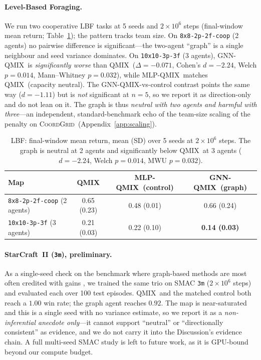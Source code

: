 \documentclass[manuscript, screen, review]{jair}
\providecommand{\citep}{\parencite}
\newcommand{\algoname}[1]{\textsc{#1}}
\newcommand{\qmix}{\algoname{QMIX}}
\newcommand{\gnnqmix}{\algoname{GNN-QMIX}}
\newcommand{\coordgrid}{\textsc{CoordGrid}}
\newcommand{\mlpqmix}{\algoname{MLP-QMIX}}
\begin{document}
\paragraph{Level-Based Foraging.} We run two cooperative LBF tasks
\citep{papoudakis_2021_benchmarking} at 5 seeds and $2\times10^6$ steps
(final-window mean return; Table~\ref{tab:lbf}); the pattern tracks team
size. On \texttt{8x8-2p-2f-coop} (2 agents) no pairwise difference is
significant---the two-agent ``graph'' is a single neighbour and seed
variance dominates. On \texttt{10x10-3p-3f} (3 agents), \gnnqmix\ is
\emph{significantly worse} than \qmix\ ($\Delta=-0.071$, Cohen's $d=-2.24$,
Welch $p=0.014$, Mann--Whitney $p=0.032$), while \mlpqmix\ matches \qmix\
(capacity neutral). The \gnnqmix-vs-control contrast points the same way
($d=-1.11$) but is \emph{not} significant at $n{=}5$, so we report it as
direction-only and do not lean on it. The graph
is thus \emph{neutral with two agents and harmful with three}---an
independent, standard-benchmark echo of the team-size scaling of the penalty
on \coordgrid\ (Appendix~\ref{app:scaling}).

\begin{table}[htbp]
  \centering
  \small
  \caption{LBF: final-window mean return, mean (SD) over 5 seeds at
  $2\times10^6$ steps. The graph is neutral at 2 agents and significantly
  below \qmix\ at 3 agents ($d=-2.24$, Welch $p=0.014$, MWU $p=0.032$).}
  \label{tab:lbf}
  \begin{tabular}{lccc}
    \toprule
    Map & \qmix & \mlpqmix\ (control) & \gnnqmix\ (graph) \\
    \midrule
    \texttt{8x8-2p-2f-coop} (2 agents) & 0.65 (0.23) & 0.48 (0.01) & 0.66 (0.24) \\
    \texttt{10x10-3p-3f} (3 agents)    & 0.21 (0.03) & 0.22 (0.10) & \textbf{0.14 (0.03)} \\
    \bottomrule
  \end{tabular}
\end{table}

\paragraph{StarCraft~II (\textup{\texttt{3m}}), preliminary.} As a single-seed check on
the benchmark where graph-based methods are most often credited with gains
\citep{samvelyan_2019_smac}, we trained the same trio on SMAC \texttt{3m}
($2\times10^6$ steps) and evaluated each over 100 test episodes. \qmix\ and the
matched control both reach a $1.00$ win rate; the graph agent reaches $0.92$.
The map is near-saturated and this is a single seed with no variance estimate,
so we report it as a \emph{non-inferential anecdote only}---it cannot support
``neutral'' or ``directionally consistent'' as evidence, and we do not carry it
into the Discussion's evidence chain. A full multi-seed SMAC study is left to
future work, as it is GPU-bound beyond our compute budget.
\end{document}
